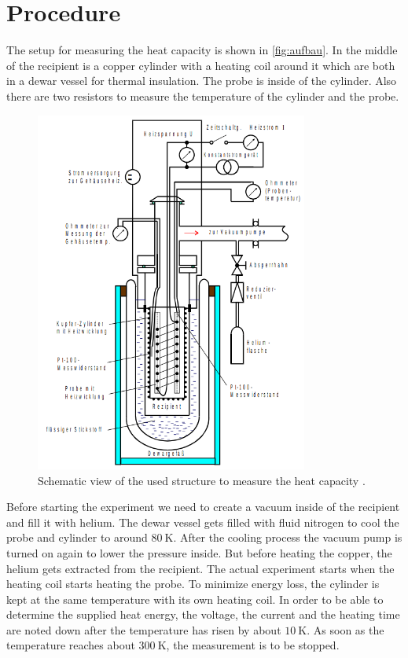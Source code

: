 \section{Procedure}
\label{sec:Durchführung}

The setup for measuring the heat capacity is shown in \autoref{fig:aufbau}.
In the middle of the recipient is a copper cylinder with a heating coil around it which are both in a dewar vessel for thermal insulation.
The probe is inside of the cylinder.
Also there are two resistors to measure the temperature of the cylinder and the probe.
\begin{figure}
    \centering
    \includegraphics[width=0.8\textwidth]{content/plots/aufbau.png}
    \caption{Schematic view of the used structure to measure the heat capacity \cite{V47}.}
    \label{fig:aufbau}
\end{figure}
Before starting the experiment we need to create a vacuum inside of the recipient and fill it with helium.
The dewar vessel gets filled with fluid nitrogen to cool the probe and cylinder to around $\qty{80}{\kelvin}$.
After the cooling process the vacuum pump is turned on again to lower the pressure inside.
But before heating the copper, the helium gets extracted from the recipient.
The actual experiment starts when the heating coil starts heating the probe.
To minimize energy loss, the cylinder is kept at the same temperature with its own heating coil.
In order to be able to determine the supplied heat energy, the voltage, the current and the heating time are noted down after the temperature has risen by about $\qty{10}{\kelvin}$.
As soon as the temperature reaches about $\qty{300}{\kelvin}$, the measurement is to be stopped.